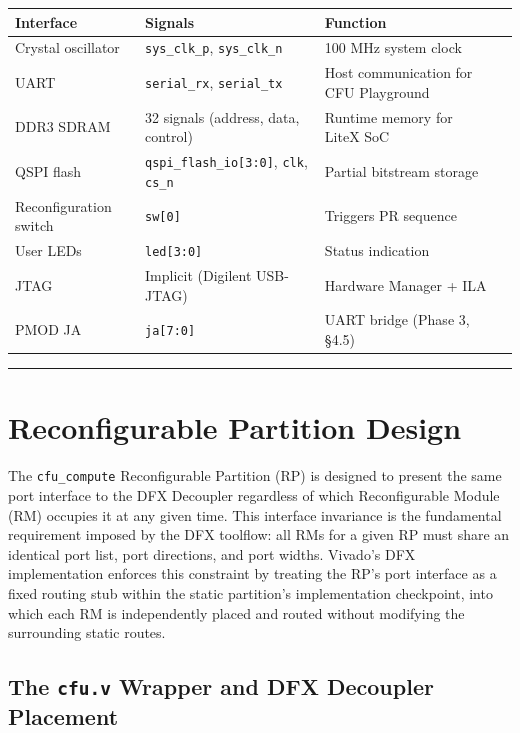 \begin{table}[htbp]
\centering
\begin{tabularx}{\textwidth}{X X X X}
\toprule
Interface & Signals & Function \\
\midrule
Crystal oscillator & \texttt{sys\_clk\_p}, \texttt{sys\_clk\_n} & 100 MHz system clock \\
UART & \texttt{serial\_rx}, \texttt{serial\_tx} & Host communication for CFU Playground \\
DDR3 SDRAM & 32 signals (address, data, control) & Runtime memory for LiteX SoC \\
QSPI flash & \texttt{qspi\_flash\_io[3:0]}, \texttt{clk}, \texttt{cs\_n} & Partial bitstream storage \\
Reconfiguration switch & \texttt{sw[0]} & Triggers PR sequence \\
User LEDs & \texttt{led[3:0]} & Status indication \\
JTAG & Implicit (Digilent USB-JTAG) & Hardware Manager + ILA \\
PMOD JA & \texttt{ja[7:0]} & UART bridge (Phase 3, §4.5) \\
\bottomrule
\end{tabularx}
\end{table}

\vspace{0.4em}\hrule\vspace{0.4em}

\section{Reconfigurable Partition Design}

The \texttt{cfu\_compute} Reconfigurable Partition (RP) is designed to present the same port interface to the DFX Decoupler regardless of which Reconfigurable Module (RM) occupies it at any given time. This interface invariance is the fundamental requirement imposed by the DFX toolflow: all RMs for a given RP must share an identical port list, port directions, and port widths. Vivado's DFX implementation enforces this constraint by treating the RP's port interface as a fixed routing stub within the static partition's implementation checkpoint, into which each RM is independently placed and routed without modifying the surrounding static routes.

\subsection{The \texttt{cfu.v} Wrapper and DFX Decoupler Placement}

